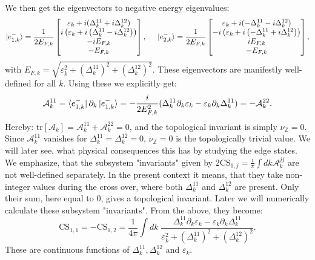We then get the eigenvectors to negative energy eigenvalues:
\begin{equation}
\ket{e^{-}_{1,k}} = \frac{1}{2E_{F,k}}\begin{bmatrix} \varepsilon_k + i(\Delta^{11}_k + i\Delta^{12}_k) \\ i\left(\varepsilon_k + i\left(\Delta^{11}_k - i\Delta^{12}_k\right)\right) \\ -iE_{F,k} \\ -E_{F,k} \end{bmatrix}, \hspace{0.5cm} \ket{e^{-}_{2,k}} = \frac{1}{2E_{F,k}}\begin{bmatrix} \varepsilon_k + i(-\Delta^{11}_k - i\Delta^{12}_k) \\ -i\left(\varepsilon_k + i\left(-\Delta^{11}_k + i\Delta^{12}_k\right)\right) \\ iE_{F,k} \\ -E_{F,k} \end{bmatrix},
\end{equation}
with $E_{F,k} = \sqrt{\varepsilon_k^2 + (\Delta^{11}_k)^2 + (\Delta^{12}_k)^2}$. These eigenvectors are manifestly well-defined for all $k$. Using these we explicitly get:
\begin{equation}
\mathcal{A}^{11}_k = \bra{e^{-}_{1,k}}\partial_k\ket{e^{-}_{1,k}} = -\frac{i}{2E_{F,k}^2}(\Delta^{11}_k\partial_k\varepsilon_k - \varepsilon_k\partial_k\Delta^{11}_k) = -\mathcal{A}^{22}_k. \nonumber
\end{equation}
Hereby: $\text{tr}[\mathcal{A}_k] = \mathcal{A}^{11}_k  + \mathcal{A}^{22}_k = 0$, and the topological invariant is simply $\nu_{\mathbb{Z}} = 0$. Since $\mathcal{A}^{11}_k$ vanishes for $\Delta^{11}_k = \Delta^{12}_k = 0$, $\nu_{\mathbb{Z}} = 0$ is the topologically trivial value. We will later see, what physical consequences this has by studying the edge states. We emphasize, that the subsystem "invariants" given by $2\text{CS}_{1,j} = \frac{i}{\pi}\int dk \mathcal{A}^{jj}_k$ are not well-defined separately. In the present context it means, that they take non-integer values during the cross over, where both $\Delta^{11}_k$ and $\Delta^{12}_k$ are present. Only their sum, here equal to $0$, gives a topological invariant. Later we will numerically calculate these subsystem "invariants". From the above, they become:
\begin{equation}
\text{CS}_{1,1} = - \text{CS}_{1,2} = \frac{1}{4\pi}\int dk \; \frac{\Delta^{11}_k\partial_k\varepsilon_k - \varepsilon_k\partial_k\Delta^{11}_k}{\varepsilon^2_k + (\Delta^{11}_k)^2 + (\Delta^{12}_k)^2}. 
\end{equation}
These are continuous functions of $\Delta^{11}_k, \Delta^{12}_k$ and $\varepsilon_k$. 

